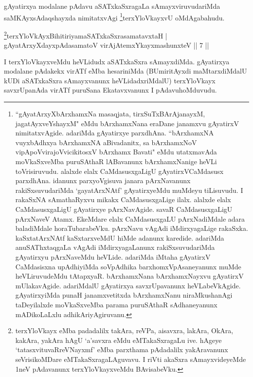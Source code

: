 \begin{artha} 
gAyatirxya modalane pAdavu aSATxkaSxragaLa sAmayxviruvudariMda\break 
saMKAyxsAdaqshayxda nimitatxvAgi \footnote{``gAyatArxyXbArxhamxNa masaqjata, tirxSuTxBArAjanayxM, jagatAyxveYshayxM" eMdu 
bArxhamxNana eraDane janamxvu gAyatirxV nimitatxvAgide. adariMda 
gAyatirxye parxdhAna. ``bArxhamxNA vuyxbAdhxya bArxhamxNA aBivadanitx, sa bArxhamxNoV vipApoVvirajoV\s vicikitosxV bArxhamx Bavati" eMdu utatxmavAda moVkaSxveMba 
puruSAthaR lABavanunx bArxhamxNanige heVLi toVrisiruvudu. alalxde 
elalx CaMdasusxgaLigU gAyatirxVCaMdasusx parxdhAna. idanunx 
parxyoVgisuva janara pArxNavanunx rakiSxsuvudariMda `gayatArxNAtf' 
gAyatirxyeMdu muMdeyu tiLisuvudu. I rakaSxNA sAmathaRyxvu mikakx 
CaMdasusxgaLige ilalx. alalxde elalx CaMdasusxgaLigU gAyatirxye 
pArxNavAgide. savaR CaMdasusxgaLigU pArxNaveV Atamx. EkeMdare elalx 
CaMdasusxgaLU pArxNadiMdale adara baladiMdale horaTubarabeVku. 
pArxNavu vAgAdi iMdirxyagaLige rakaSxka. kaSxtatArxNAtf kaSxtarxveMdU 
hiMde adanunx karedide. adariMda anuSAThxtaqgaLa vAgAdi 
iMdirxyagaLanunx rakiSxsuvudariMda gAyatirxyu pArxNaveMdu heVLide. 
adariMda iMtaha gAyatirxV CaMdasisxna upAdhiyiMda soVpAdhika 
barxhomxVpAsaneyanunx muMde heVLiruvudeMdu tAtapxyaR. bArxhamxNana 
bArxhamxNayxvu gAyatirxV mUlakavAgide. adariMdalU gAyatirxya 
savxrUpavanunx heVLabeVkAgide. gAyatirxyiMda punaH janamxvetitxda 
bArxhamxNanu niraMkushanAgi taDeyilalxde moVkaSxveMba parama 
puruSAthaR sAdhaneyanunx mADikoLaLxlu adhikAriyAgiruvanu.}terxYloVkayxvU 
oMdAgabahudu.
\end{artha}


\begin{shl}
\footnote{terxYloVkayx eMba padadalilx takAra, reVPa, aisavxra, lakAra, OkAra, kakAra, yakAra hAgU `a'savxra eMdu eMTakaSxragaLu ive. hAgeye `tatasxvituvaRreVNayxmf' eMba parxthama pAdadalilx yakAravanunx seVrisikoMDare eMTakaSxragaLAguvavu. I riVti akaSxra sAmayxvideyeMde 1neV pAdavanunx terxYloVkayxveMdu BAvisabeVku.}terxYloVkAyxBihitiriyamaSATxkaSxrasamatavxtaH | \\
gAyatArxyXdayxpAdasamatoV virAjA\s \s temxYkayxmashunxteV \hfill ||  7 || 
\end{shl}

\begin{artha} 
I terxYloVkayxveMdu heVLidudx aSATxkaSxra sAmayxdiMda. gAyatirxya 
modalane pAdakekx virATf eMba hesariniMda (BUmiritAyxdi maMtarxdiMdalU 
kUDi aSATxkaSxra sAmayxvanunx heVLidadxriMdalU) terxYloVkayx 
savxrUpanAda virATf puruSana Ekatavxvanunx I pAdavu\break hoMduvudu.
\end{artha}

